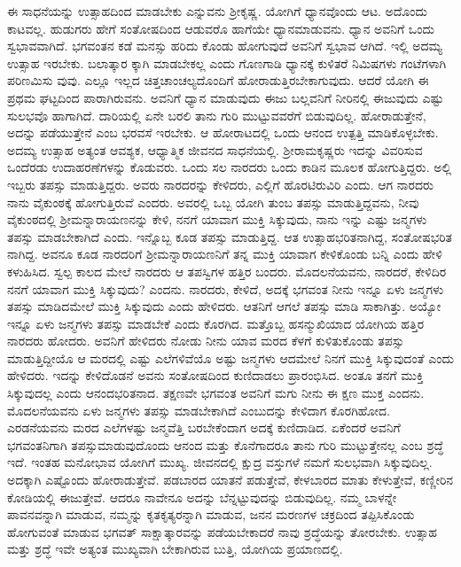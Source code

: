 ಈ ಸಾಧನೆಯನ್ನು ಉತ್ಸಾಹದಿಂದ ಮಾಡಬೇಕು ಎನ್ನುವನು ಶ‍್ರೀಕೃಷ್ಣ. ಯೋಗಿಗೆ ಧ್ಯಾನವೊಂದು ಆಟ. ಅದೊಂದು ಕಾಟವಲ್ಲ. ಹುಡುಗರು ಹೇಗೆ ಸಂತೋಷದಿಂದ ಆಡುವರೊ ಹಾಗೆಯೇ ಧ್ಯಾನಮಾಡುವನು. ಧ್ಯಾನ ಅವನಿಗೆ ಒಂದು ಸ್ವಭಾವವಾಗಿದೆ. ಭಗವಂತನ ಕಡೆ ಮನಸ್ಸು ಹರಿದು ಕೊಂಡು ಹೋಗುವುದೆ ಅವನಿಗೆ ಸ್ವಭಾವ ಆಗಿದೆ. ಇಲ್ಲಿ ಅದಮ್ಯ ಉತ್ಸಾಹ ಇರಬೇಕು. ಬಲಾತ್ಕಾರ ಕ್ಕಾಗಿ ಮಾಡಬೇಕಲ್ಲ ಎಂದು ಗೊಣಗಾಡಿ ಧ್ಯಾನಕ್ಕೆ ಕುಳಿತರೆ ನಿಮಿಷಗಳು ಗಂಟೆಗಳಾಗಿ ಪರಿಣಮಿಸು ವುವು. ಎಲ್ಲೂ ಇಲ್ಲದ ಚಿತ್ತಚಾಂಚಲ್ಯದೊಂದಿಗೆ ಹೋರಾಡುತ್ತಿರಬೇಕಾಗುವುದು. ಆದರೆ ಯೋಗಿ ಈ ಪ್ರಥಮ ಘಟ್ಟದಿಂದ ಪಾರಾಗಿರುವನು. ಅವನಿಗೆ ಧ್ಯಾನ ಮಾಡುವುದು ಈಜು ಬಲ್ಲವನಿಗೆ ನೀರಿನಲ್ಲಿ ಈಜುವುದು ಎಷ್ಟು ಸುಲಭವೊ ಹಾಗಾಗಿದೆ. ದಾರಿಯಲ್ಲಿ ಏನೇ ಬರಲಿ ತಾನು ಗುರಿ ಮುಟ್ಟುವವರೆಗೆ ಬಿಡುವುದಿಲ್ಲ. ಹೋರಾಡುತ್ತೇನೆ, ಅದನ್ನು ಪಡೆಯುತ್ತೇನೆ ಎಂಬ ಭರವಸೆ ಇರಬೇಕು. ಆ ಹೋರಾಟದಲ್ಲಿ ಒಂದು ಆನಂದ ಉತ್ಪತ್ತಿ ಮಾಡಿಕೊಳ್ಳಬೇಕು. ಅದಮ್ಯ ಉತ್ಸಾಹ ಅತ್ಯಂತ ಆವಶ್ಯಕ, ಆಧ್ಯಾತ್ಮಿಕ ಜೀವನದ ಸಾಧನೆಯಲ್ಲಿ. ಶ‍್ರೀರಾಮಕೃಷ್ಣರು ಇದನ್ನು ವಿವರಿಸುವ ಒಂದೆರಡು ಉದಾಹರಣೆಗಳನ್ನು ಕೊಡುವರು. ಒಂದು ಸಲ ನಾರದರು ಒಂದು ಕಾಡಿನ ಮೂಲಕ ಹೋಗುತ್ತಿದ್ದರು. ಅಲ್ಲಿ ಇಬ್ಬರು ತಪಸ್ಸು ಮಾಡುತ್ತಿದ್ದರು. ಅವರು ನಾರದರನ್ನು ಕೇಳಿದರು, ಎಲ್ಲಿಗೆ ಹೊರಟಿರುವಿರಿ ಎಂದು. ಆಗ ನಾರದರು ನಾನು ವೈಕುಂಠಕ್ಕೆ ಹೋಗುತ್ತಿರುವೆ ಎಂದರು. ಅವರಲ್ಲಿ ಒಬ್ಬ ಯೋಗಿ ತುಂಬ ತಪಸ್ಸು ಮಾಡುತ್ತಿದ್ದವನು, ನೀವು ವೈಕುಂಠದಲ್ಲಿ ಶ‍್ರೀಮನ್ನಾರಾಯಣನನ್ನು ಕೇಳಿ, ನನಗೆ ಯಾವಾಗ ಮುಕ್ತಿ ಸಿಕ್ಕುವುದು, ನಾನು ಇನ್ನು ಎಷ್ಟು ಜನ್ಮಗಳು ತಪಸ್ಸು ಮಾಡಬೇಕಾಗಿದೆ ಎಂದು. ಇನ್ನೊಬ್ಬ ಕೂಡ ತಪಸ್ಸು ಮಾಡುತ್ತಿದ್ದ. ಆತ ಉತ್ಸಾಹಭರಿತನಾಗಿದ್ದ, ಸಂತೋಷಭರಿತ ನಾಗಿದ್ದ. ಅವನೂ ಕೂಡ ನಾರದರಿಗೆ ಶ‍್ರೀಮನ್ನಾರಾಯಣನಿಗೆ ತನ್ನ ಮುಕ್ತಿ ಯಾವಾಗ ಕೇಳಿಕೊಂಡು ಬನ್ನಿ ಎಂದು ಹೇಳಿ ಕಳುಹಿಸಿದ. ಸ್ವಲ್ಪ ಕಾಲದ ಮೇಲೆ ನಾರದರು ಆ ತಪಸ್ವಿಗಳ ಹತ್ತಿರ ಬಂದರು. ಮೊದಲನೆಯವನು, ನಾರದರೆ, ಕೇಳಿದಿರ ನನಗೆ ಯಾವಾಗ ಮುಕ್ತಿ ಸಿಕ್ಕುವುದು? ಎಂದನು. ನಾರದರು, ಕೇಳಿದೆ, ಅದಕ್ಕೆ ಭಗವಂತ ನೀನು ಇನ್ನೂ ಏಳು ಜನ್ಮಗಳು ತಪಸ್ಸು ಮಾಡಿದಮೇಲೆ ಮುಕ್ತಿ ಸಿಕ್ಕುವುದು ಎಂದು ಹೇಳಿದರು. ಆತನಿಗೆ ಆಗಲೆ ತಪಸ್ಸು ಮಾಡಿ ಸಾಕಾಗಿತ್ತು. ಅಯ್ಯೋ ಇನ್ನೂ ಏಳು ಜನ್ಮಗಳು ತಪಸ್ಸು ಮಾಡಬೇಕೆ ಎಂದು ಕೊರಗಿದ. ಮತ್ತೊಬ್ಬ ಹಸನ್ಮುಖಿಯಾದ ಯೋಗಿಯ ಹತ್ತಿರ ನಾರದರು ಹೋದರು. ಅವನಿಗೆ ಹೇಳಿದರು ನೋಡು ನೀನು ಯಾವ ಮರದ ಕೆಳಗೆ ಕುಳಿತುಕೊಂಡು ತಪಸ್ಸು ಮಾಡುತ್ತಿದ್ದೀಯೊ ಆ ಮರದಲ್ಲಿ ಎಷ್ಟು ಎಲೆಗಳಿವೆಯೊ ಅಷ್ಟು ಜನ್ಮಗಳು ಆದಮೇಲೆ ನಿನಗೆ ಮುಕ್ತಿ ಸಿಕ್ಕುವುದಂತೆ ಎಂದು ಹೇಳಿದರು. ಇದನ್ನು ಕೇಳಿದೊಡನೆ ಅವನು ಸಂತೋಷದಿಂದ ಕುಣಿದಾಡಲು ಪ್ರಾರಂಭಿಸಿದ. ಅಂತೂ ತನಗೆ ಮುಕ್ತಿ ಸಿಕ್ಕುವುದಲ್ಲ ಎಂದು ಆನಂದಭರಿತನಾದ. ತಕ್ಷಣವೇ ಭಗವಂತ ಅವನಿಗೆ ಮಗು ನೀನು ಈ ಕ್ಷಣ ಮುಕ್ತ ಎಂದನು. ಮೊದಲನೆಯವನು ಏಳು ಜನ್ಮಗಳು ತಪಸ್ಸು ಮಾಡಬೇಕಾಗಿದೆ ಎಂಬುದನ್ನು ಕೇಳಿದಾಗ ಕೊರಗಿಹೋದ. ಎರಡನೆಯವನು ಮರದ ಎಲೆಗಳಷ್ಟು ಜನ್ಮವೆತ್ತಿ ಬರಬೇಕೆಂದಾಗ ಅದಕ್ಕೆ ಕುಣಿದಾಡಿದ. ಏಕೆಂದರೆ ಅವನಿಗೆ ಭಗವಂತನಿಗಾಗಿ ತಪಸ್ಸುಮಾಡುವುದೊಂದು ಆನಂದ ಮತ್ತು ಕೊನೆಗಾದರೂ ತಾನು ಗುರಿ ಮುಟ್ಟುತ್ತೇನಲ್ಲ ಎಂಬ ಶ್ರದ್ಧೆ ಇದೆ. ಇಂತಹ ಮನೋಭಾವ ಯೋಗಿಗೆ ಮುಖ್ಯ. ಜೀವನದಲ್ಲಿ ಕ್ಷುದ್ರ ವಸ್ತುಗಳೆ ನಮಗೆ ಸುಲಭವಾಗಿ ಸಿಕ್ಕುವುದಿಲ್ಲ. ಅದಕ್ಕಾಗಿ ಎಷ್ಟೊಂದು ಹೋರಾಡುತ್ತೇವೆ. ಪಡಬಾರದ ಯಾತನೆ ಪಡುತ್ತೇವೆ, ಕೇಳಬಾರದ ಮಾತು ಕೇಳುತ್ತೇವೆ, ಕಣ್ಣೀರಿನ ಕೋಡಿಯಲ್ಲಿ ಈಜುತ್ತೇವೆ. ಆದರೂ ನಾವೇನೂ ಅದನ್ನು ಬೆನ್ನಟ್ಟುವುದನ್ನು ಬಿಡುವುದಿಲ್ಲ. ನಮ್ಮ ಬಾಳನ್ನೇ ಪಾವನವನ್ನಾಗಿ ಮಾಡುವ, ನಮ್ಮನ್ನು ಕೃತಕೃತ್ಯರನ್ನಾಗಿ ಮಾಡುವ, ಜನನ ಮರಣಗಳ ಚಕ್ರದಿಂದ ತಪ್ಪಿಸಿಕೊಂಡು ಹೋಗುವಂತೆ ಮಾಡುವ ಭಗವತ್ ಸಾಕ್ಷಾತ್ಕಾರವನ್ನು ಪಡೆಯಬೇಕಾದರೆ ನಾವು ಶ್ರದ್ಧೆಯನ್ನು ತೋರಬೇಕು. ಉತ್ಸಾಹ ಮತ್ತು ಶ್ರದ್ಧೆ ಇವೇ ಅತ್ಯಂತ ಮುಖ್ಯವಾಗಿ ಬೇಕಾಗಿರುವ ಬುತ್ತಿ, ಯೋಗಿಯ ಪ್ರಯಾಣದಲ್ಲಿ.

